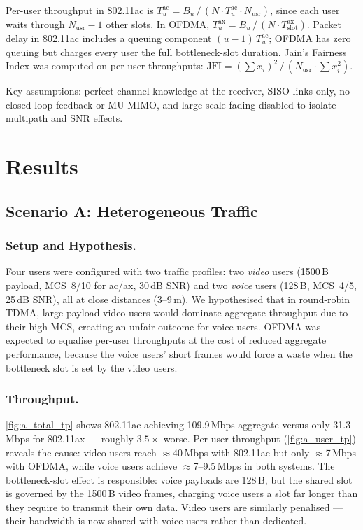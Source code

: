\documentclass[twocolumn]{article}
\begin{document}
Per-user throughput in 802.11ac is $T_u^\text{ac} = B_u \,/\, (N \cdot T_u^\text{ac} \cdot N_\text{usr})$, since each user waits through $N_\text{usr}-1$ other slots. In OFDMA, $T_u^\text{ax} = B_u \,/\, (N \cdot T_\text{slot}^\text{ax})$. Packet delay in 802.11ac includes a queuing component $(u{-}1)\,T_u^\text{ac}$; OFDMA has zero queuing but charges every user the full bottleneck-slot duration. Jain's Fairness Index was computed on per-user throughputs: $\text{JFI} = (\sum x_i)^2 \,/\, (N_\text{usr} \cdot \sum x_i^2)$.

Key assumptions: perfect channel knowledge at the receiver, SISO links only, no closed-loop feedback or MU-MIMO, and large-scale fading disabled to isolate multipath and SNR effects.

\section{Results}

\subsection{Scenario A: Heterogeneous Traffic}

\subsubsection{Setup and Hypothesis.}
Four users were configured with two traffic profiles: two \emph{video} users (1500\,B payload, MCS~8/10 for ac/ax, 30\,dB SNR) and two \emph{voice} users (128\,B, MCS~4/5, 25\,dB SNR), all at close distances (3--9\,m). We hypothesised that in round-robin TDMA, large-payload video users would dominate aggregate throughput due to their high MCS, creating an unfair outcome for voice users. OFDMA was expected to equalise per-user throughputs at the cost of reduced aggregate performance, because the voice users' short frames would force a waste when the bottleneck slot is set by the video users.

\subsubsection{Throughput.}
\autoref{fig:a_total_tp} shows 802.11ac achieving 109.9\,Mbps aggregate versus only 31.3\,Mbps for 802.11ax — roughly $3.5\times$ worse. Per-user throughput (\autoref{fig:a_user_tp}) reveals the cause: video users reach $\approx$40\,Mbps with 802.11ac but only $\approx$7\,Mbps with OFDMA, while voice users achieve $\approx$7--9.5\,Mbps in both systems. The bottleneck-slot effect is responsible: voice payloads are 128\,B, but the shared slot is governed by the 1500\,B video frames, charging voice users a slot far longer than they require to transmit their own data. Video users are similarly penalised — their bandwidth is now shared with voice users rather than dedicated.
\end{document}

